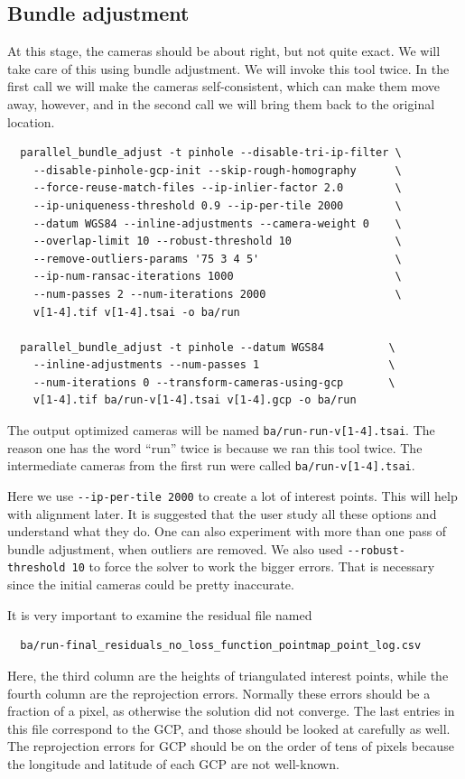 \subsection{Bundle adjustment}

At this stage, the cameras should be about right, but not quite
exact. We will take care of this using bundle adjustment. 
We will invoke this tool twice. In the first call we will make the
cameras self-consistent, which can make them move away, however,
and in the second call we will bring them back to the original location.

\begin{verbatim}
  parallel_bundle_adjust -t pinhole --disable-tri-ip-filter \
    --disable-pinhole-gcp-init --skip-rough-homography      \
    --force-reuse-match-files --ip-inlier-factor 2.0        \
    --ip-uniqueness-threshold 0.9 --ip-per-tile 2000        \
    --datum WGS84 --inline-adjustments --camera-weight 0    \
    --overlap-limit 10 --robust-threshold 10                \
    --remove-outliers-params '75 3 4 5'                     \
    --ip-num-ransac-iterations 1000                         \
    --num-passes 2 --num-iterations 2000                    \
    v[1-4].tif v[1-4].tsai -o ba/run

  parallel_bundle_adjust -t pinhole --datum WGS84          \
    --inline-adjustments --num-passes 1                    \
    --num-iterations 0 --transform-cameras-using-gcp       \
    v[1-4].tif ba/run-v[1-4].tsai v[1-4].gcp -o ba/run
\end{verbatim}

The output optimized cameras will be named \texttt{ba/run-run-v[1-4].tsai}.
The reason one has the word ``run'' twice is because we ran 
this tool twice. The intermediate cameras from the first run 
were called \texttt{ba/run-v[1-4].tsai}.

Here we use \texttt{-\/-ip-per-tile 2000} to create a lot of interest
points. This will help with alignment later. It is suggested that the
user study all these options and understand what they do. 
One can also experiment with more than one pass of bundle adjustment,
when outliers are removed. We also used \texttt{-\/-robust-threshold 10}
to force the solver to work the bigger errors. That is necessary
since the initial cameras could be pretty inaccurate. 

It is very important to examine the residual file named
\begin{verbatim}
  ba/run-final_residuals_no_loss_function_pointmap_point_log.csv
\end{verbatim}
Here, the third column are the heights of triangulated interest points,
while the fourth column are the reprojection errors.  Normally these
errors should be a fraction of a pixel, as otherwise the solution did not
converge. The last entries in this file correspond to the GCP, and
those should be looked at carefully as well. The reprojection errors for GCP
should be on the order of tens of pixels because the longitude and latitude
of each GCP are not well-known. 


